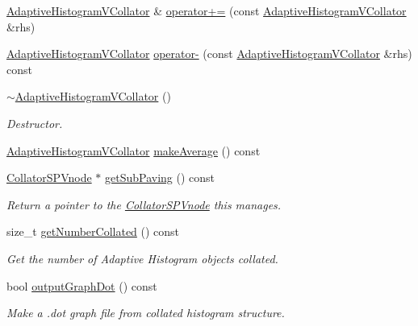 \begin{DoxyCompactItemize}
\hyperlink{classsubpavings_1_1AdaptiveHistogramVCollator}{\-Adaptive\-Histogram\-V\-Collator} \& \hyperlink{classsubpavings_1_1AdaptiveHistogramVCollator_ae8856c3f66db77b6f0ce896ff4f54ce5}{operator+=} (const \hyperlink{classsubpavings_1_1AdaptiveHistogramVCollator}{\-Adaptive\-Histogram\-V\-Collator} \&rhs)
\item 
\hyperlink{classsubpavings_1_1AdaptiveHistogramVCollator}{\-Adaptive\-Histogram\-V\-Collator} \hyperlink{classsubpavings_1_1AdaptiveHistogramVCollator_a56acb0f59cd7c99a5ef8db73fd2b3294}{operator-\/} (const \hyperlink{classsubpavings_1_1AdaptiveHistogramVCollator}{\-Adaptive\-Histogram\-V\-Collator} \&rhs) const 
\item 
\hyperlink{classsubpavings_1_1AdaptiveHistogramVCollator_a7fdc8a90199d4b39d4fb9179a8aada56}{$\sim$\-Adaptive\-Histogram\-V\-Collator} ()
\begin{DoxyCompactList}\small\item\em \-Destructor. \end{DoxyCompactList}\item 
\hyperlink{classsubpavings_1_1AdaptiveHistogramVCollator}{\-Adaptive\-Histogram\-V\-Collator} \hyperlink{classsubpavings_1_1AdaptiveHistogramVCollator_a1d9fe1618884a4cdbfc211a04dcd4a65}{make\-Average} () const 
\item 
\hyperlink{classsubpavings_1_1CollatorSPVnode}{\-Collator\-S\-P\-Vnode} $\ast$ \hyperlink{classsubpavings_1_1AdaptiveHistogramVCollator_a4fc5807fde8de008b9551f6347c6d46e}{get\-Sub\-Paving} () const 
\begin{DoxyCompactList}\small\item\em \-Return a pointer to the \hyperlink{classsubpavings_1_1CollatorSPVnode}{\-Collator\-S\-P\-Vnode} this manages. \end{DoxyCompactList}\item 
size\-\_\-t \hyperlink{classsubpavings_1_1AdaptiveHistogramVCollator_a7268bf31ef2baf216134f5751e5c6173}{get\-Number\-Collated} () const 
\begin{DoxyCompactList}\small\item\em \-Get the number of \-Adaptive \-Histogram objects collated. \end{DoxyCompactList}\item 
bool \hyperlink{classsubpavings_1_1AdaptiveHistogramVCollator_a6cbc7efc97efaa397a6ed5c38b817e3a}{output\-Graph\-Dot} () const 
\begin{DoxyCompactList}\small\item\em \-Make a .dot graph file from collated histogram structure. \end{DoxyCompactList}\item 

\end{DoxyCompactItemize}
